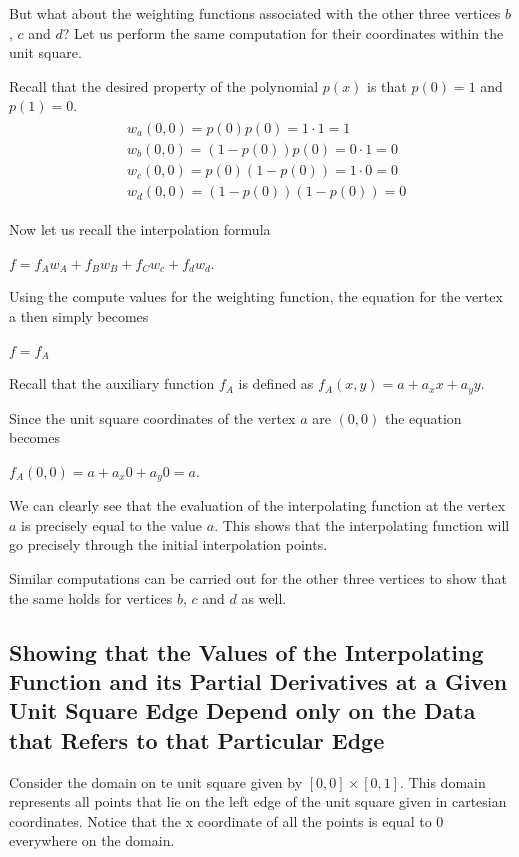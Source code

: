 \documentclass[fleqn]{article}
\begin{document}
But what about the weighting functions associated with the other three vertices $b$, $c$ and $d$? Let us perform the same computation for their coordinates within the unit square.

Recall that the desired property of the polynomial $p(x)$ is that $p(0) = 1$ and $p(1) = 0$.
\begin{align}
\begin{split}
& w_{a}(0, 0) = p(0)p(0) = 1 \cdot 1 = 1 \\
& w_{b}(0, 0) = (1 - p(0))p(0) = 0 \cdot 1 = 0 \\
& w_{c}(0, 0) = p(0)(1 - p(0)) = 1 \cdot 0 = 0 \\
& w_{d}(0, 0) = (1 - p(0))(1 - p(0)) = 0
\end{split}
\end{align}

Now let us recall the interpolation formula

$f = f_{A}w_{A} + f_{B}w_{B} + f_{C}w_{c} + f_{d}w_{d}$.

Using the compute values for the weighting function, the equation for the vertex a then simply becomes

$f = f_{A}$

Recall that the auxiliary function $f_{A}$ is defined as 
$f_{A}(x, y) = a + a_{x}x + a_{y}y$.

Since the unit square coordinates of the vertex $a$ are $(0, 0)$ the equation becomes

$f_{A}(0, 0) = a + a_{x}0 + a_{y}0 = a$.

We can clearly see that the evaluation of the interpolating function at the vertex $a$ is precisely equal to the value $a$. This shows that the interpolating function will go precisely through the initial interpolation points.

Similar computations can be carried out for the other three vertices to show that the same holds for vertices $b$, $c$ and $d$ as well.

\subsection{Showing that the Values of the Interpolating Function and its Partial Derivatives at a Given Unit Square Edge Depend only on the Data that Refers to that Particular Edge}

Consider the domain on te unit square given by $[0, 0] \times [0, 1]$. This domain represents all points that lie on the left edge of the unit square given in cartesian coordinates. Notice that the x coordinate of all the points is equal to $0$ everywhere on the domain.
\end{document}
